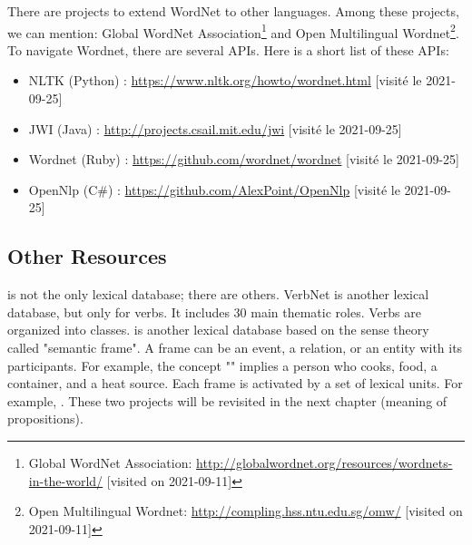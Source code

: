 \documentclass{KBook}
\begin{document}
%

There are projects to extend WordNet to other languages. 
Among these projects, we can mention: Global WordNet Association\footnote{Global WordNet Association: \url{http://globalwordnet.org/resources/wordnets-in-the-world/} [visited on 2021-09-11]} and Open Multilingual Wordnet\footnote{Open Multilingual Wordnet: \url{http://compling.hss.ntu.edu.sg/omw/} [visited on 2021-09-11]}.
To navigate Wordnet, there are several APIs. 
Here is a short list of these APIs:
\begin{itemize}
	\item NLTK (Python) : \url{https://www.nltk.org/howto/wordnet.html} [visité le 2021-09-25]
	\item JWI (Java) : \url{http://projects.csail.mit.edu/jwi} [visité le 2021-09-25]
	\item Wordnet (Ruby) : \url{https://github.com/wordnet/wordnet} [visité le 2021-09-25]
	\item OpenNlp (C\#) : \url{https://github.com/AlexPoint/OpenNlp} [visité le 2021-09-25]
\end{itemize}

\subsection{Other Resources}

 is not the only lexical database; there are others. 
VerbNet is another lexical database, but only for verbs. 
It includes 30 main thematic roles. 
Verbs are organized into classes. 
 is another lexical database based on the sense theory called "semantic frame". 
A frame can be an event, a relation, or an entity with its participants. 
For example, the concept "" implies a person who cooks, food, a container, and a heat source.
Each frame is activated by a set of lexical units. 
For example, .
These two projects will be revisited in the next chapter (meaning of propositions).
\end{document}
